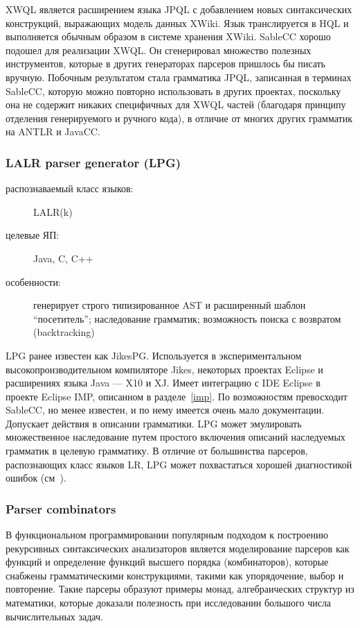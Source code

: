 \documentclass[a4paper,12pt,titlepage]{extarticle}
\begin{document}
XWQL является расширением языка JPQL \cite{jpql} с добавлением новых
синтаксических конструкций, выражающих модель данных XWiki. Язык транслируется
в HQL и выполняется обычным образом в системе хранения XWiki. SableCC хорошо
подошел для реализации XWQL. Он сгенерировал множество полезных инструментов,
которые в других генераторах парсеров пришлось бы писать вручную. Побочным
результатом стала грамматика JPQL, записанная в терминах SableCC, которую можно
повторно использовать в других проектах, поскольку она не содержит никаких
специфичных для XWQL частей (благодаря принципу отделения генерируемого и
ручного кода), в отличие от многих других грамматик на ANTLR и JavaCC.

\subsubsection*{LALR parser generator (LPG)}
\begin{description}
  \item[распознаваемый класс языков:] LALR(k)
  \item[целевые ЯП:] Java, C, C++
  \item[особенности:] генерирует строго типизированное AST и расширенный
 	шаблон ``посетитель''; наследование грамматик; возможность поиска с возвратом
 	(backtracking)
\end{description}

LPG ранее известен как JikesPG. Используется в экспериментальном
высокопроизводительном компиляторе Jikes, некоторых проектах
Eclipse и расширениях языка Java --- X10 и XJ. Имеет интеграцию с IDE Eclipse в
проекте Eclipse IMP, описанном в разделе~\ref{imp}. По возможностям превосходит
SableCC, но менее известен, и по нему имеется очень мало документации.
Допускает действия в описании грамматики. LPG может эмулировать множественное
наследование путем простого включения описаний наследуемых грамматик в целевую
грамматику. В отличие от большинства парсеров, распознающих класс языков LR,
LPG может похвастаться хорошей диагностикой ошибок (см~\cite{lpgerr}).

\subsubsection*{Parser combinators}
В функциональном программировании популярным подходом к построению рекурсивных
синтаксических анализаторов является моделирование парсеров как функций и
определение функций высшего порядка (комбинаторов), которые снабжены
грамматическими конструкциями, такими как упорядочение, выбор и повторение.
Такие парсеры образуют примеры монад, алгебраических структур из математики,
которые доказали полезность при исследовании большого числа вычислительных
задач.
\end{document}
